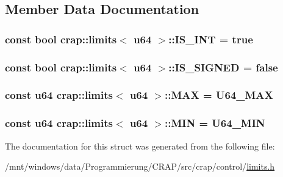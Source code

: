 \subsection{Member Data Documentation}
\hypertarget{structcrap_1_1limits_3_01u64_01_4_a3ea308607ff41e00fd16ddd0e9fbdb2d}{
\subsubsection[{I\-S\-\_\-\-I\-N\-T}]{\setlength{\rightskip}{0pt plus 5cm}const bool {\bf crap\-::limits}$<$ {\bf u64} $>$\-::I\-S\-\_\-\-I\-N\-T = true\hspace{0.3cm}{\ttfamily [static]}}}\label{structcrap_1_1limits_3_01u64_01_4_a3ea308607ff41e00fd16ddd0e9fbdb2d}
\hypertarget{structcrap_1_1limits_3_01u64_01_4_ab32b1932605073ebb8b29cfa59ea1d6d}{
\subsubsection[{I\-S\-\_\-\-S\-I\-G\-N\-E\-D}]{\setlength{\rightskip}{0pt plus 5cm}const bool {\bf crap\-::limits}$<$ {\bf u64} $>$\-::I\-S\-\_\-\-S\-I\-G\-N\-E\-D = false\hspace{0.3cm}{\ttfamily [static]}}}\label{structcrap_1_1limits_3_01u64_01_4_ab32b1932605073ebb8b29cfa59ea1d6d}
\hypertarget{structcrap_1_1limits_3_01u64_01_4_a948bee8825f44d2d1ca308119a564f8d}{
\subsubsection[{M\-A\-X}]{\setlength{\rightskip}{0pt plus 5cm}const {\bf u64} {\bf crap\-::limits}$<$ {\bf u64} $>$\-::M\-A\-X = {\bf U64\-\_\-\-M\-A\-X}\hspace{0.3cm}{\ttfamily [static]}}}\label{structcrap_1_1limits_3_01u64_01_4_a948bee8825f44d2d1ca308119a564f8d}
\hypertarget{structcrap_1_1limits_3_01u64_01_4_a307736ccb34fa4e61dc2e993f1e029db}{
\subsubsection[{M\-I\-N}]{\setlength{\rightskip}{0pt plus 5cm}const {\bf u64} {\bf crap\-::limits}$<$ {\bf u64} $>$\-::M\-I\-N = {\bf U64\-\_\-\-M\-I\-N}\hspace{0.3cm}{\ttfamily [static]}}}\label{structcrap_1_1limits_3_01u64_01_4_a307736ccb34fa4e61dc2e993f1e029db}


The documentation for this struct was generated from the following file\-:\begin{DoxyCompactItemize}
\item 
/mnt/windows/data/\-Programmierung/\-C\-R\-A\-P/src/crap/control/\hyperlink{limits_8h}{limits.\-h}\end{DoxyCompactItemize}
